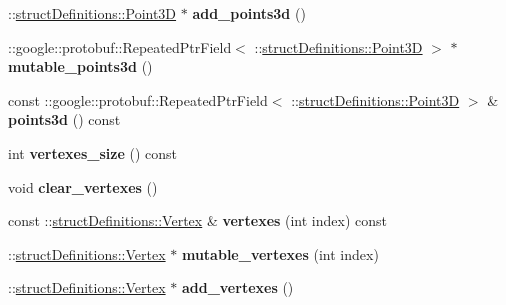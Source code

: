 \begin{DoxyCompactItemize}
\hypertarget{classstruct_definitions_1_1_data_package_acabb4a50b73630ceb3f8dcdcc3265359}{}\label{classstruct_definitions_1_1_data_package_acabb4a50b73630ceb3f8dcdcc3265359} 
\+::\hyperlink{classstruct_definitions_1_1_point3_d}{struct\+Definitions\+::\+Point3D} $\ast$ {\bfseries add\+\_\+points3d} ()
\item 
\hypertarget{classstruct_definitions_1_1_data_package_aa78e5b1381e8eb8bfa7c92be92f27d1c}{}\label{classstruct_definitions_1_1_data_package_aa78e5b1381e8eb8bfa7c92be92f27d1c} 
\+::google\+::protobuf\+::\+Repeated\+Ptr\+Field$<$ \+::\hyperlink{classstruct_definitions_1_1_point3_d}{struct\+Definitions\+::\+Point3D} $>$ $\ast$ {\bfseries mutable\+\_\+points3d} ()
\item 
\hypertarget{classstruct_definitions_1_1_data_package_aefa922cb76535fce62590e32d70cb109}{}\label{classstruct_definitions_1_1_data_package_aefa922cb76535fce62590e32d70cb109} 
const \+::google\+::protobuf\+::\+Repeated\+Ptr\+Field$<$ \+::\hyperlink{classstruct_definitions_1_1_point3_d}{struct\+Definitions\+::\+Point3D} $>$ \& {\bfseries points3d} () const
\item 
\hypertarget{classstruct_definitions_1_1_data_package_a3d7fc924c1f298420dc223f6c3089d9c}{}\label{classstruct_definitions_1_1_data_package_a3d7fc924c1f298420dc223f6c3089d9c} 
int {\bfseries vertexes\+\_\+size} () const
\item 
\hypertarget{classstruct_definitions_1_1_data_package_aa5f63f5f4b4cb8fe09c1511242e1de96}{}\label{classstruct_definitions_1_1_data_package_aa5f63f5f4b4cb8fe09c1511242e1de96} 
void {\bfseries clear\+\_\+vertexes} ()
\item 
\hypertarget{classstruct_definitions_1_1_data_package_a90cb8ac602c1765c3bc2679c5e4eb91e}{}\label{classstruct_definitions_1_1_data_package_a90cb8ac602c1765c3bc2679c5e4eb91e} 
const \+::\hyperlink{classstruct_definitions_1_1_vertex}{struct\+Definitions\+::\+Vertex} \& {\bfseries vertexes} (int index) const
\item 
\hypertarget{classstruct_definitions_1_1_data_package_ac142b6d81aaa389b92a3c6d6f95cdd9f}{}\label{classstruct_definitions_1_1_data_package_ac142b6d81aaa389b92a3c6d6f95cdd9f} 
\+::\hyperlink{classstruct_definitions_1_1_vertex}{struct\+Definitions\+::\+Vertex} $\ast$ {\bfseries mutable\+\_\+vertexes} (int index)
\item 
\hypertarget{classstruct_definitions_1_1_data_package_ab571d9cc551a07eebc70d723c17c03d5}{}\label{classstruct_definitions_1_1_data_package_ab571d9cc551a07eebc70d723c17c03d5} 
\+::\hyperlink{classstruct_definitions_1_1_vertex}{struct\+Definitions\+::\+Vertex} $\ast$ {\bfseries add\+\_\+vertexes} ()

\end{DoxyCompactItemize}
